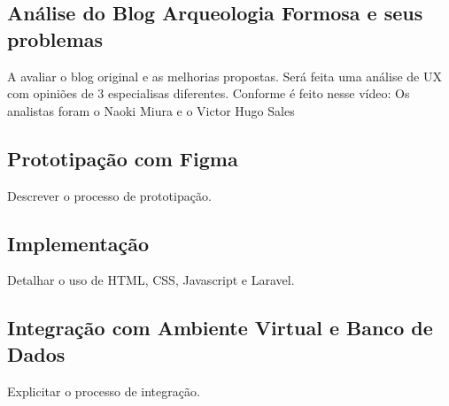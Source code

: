 \subsection{Análise do Blog Arqueologia Formosa e seus problemas}
A avaliar o blog original e as melhorias propostas.
Será feita uma análise de UX com opiniões de 3 especialisas diferentes.
Conforme é feito nesse vídeo: 
Os analistas foram o Naoki Miura e o Victor Hugo Sales

\subsection{Prototipação com Figma}
Descrever o processo de prototipação.

\subsection{Implementação}
Detalhar o uso de HTML, CSS, Javascript e Laravel.

\subsection{Integração com Ambiente Virtual e Banco de Dados}
Explicitar o processo de integração.